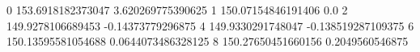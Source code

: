 0 153.6918182373047 3.620269775390625
1 150.07154846191406 0.0
2 149.9278106689453 -0.14373779296875
4 149.9330291748047 -0.138519287109375
6 150.13595581054688 0.0644073486328125
8 150.27650451660156 0.2049560546875

